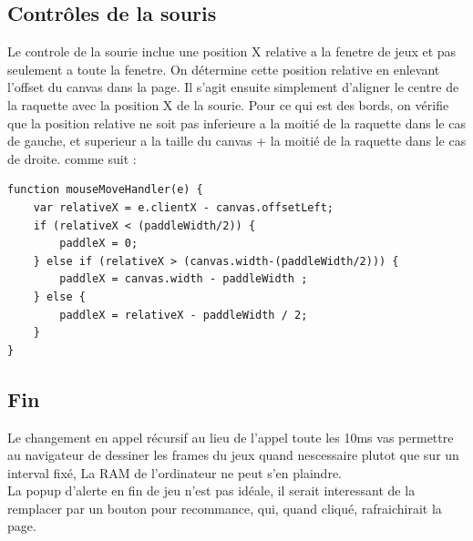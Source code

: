 \documentclass[12pt]{exam}
\begin{document}
\subsection{Contrôles de la souris}
Le controle de la sourie inclue une position X relative a la fenetre de jeux et pas seulement a toute la fenetre. On détermine cette position relative en enlevant l'offset du canvas dans la page. Il s'agit ensuite simplement d'aligner le centre de la raquette avec la position X de la sourie. Pour ce qui est des bords, on vérifie que la position relative ne soit pas inferieure a la moitié de la raquette dans le cas de gauche, et superieur a la taille du canvas + la moitié de la raquette dans le cas de droite. comme suit :
\newpage
\begin{verbatim}
function mouseMoveHandler(e) {
    var relativeX = e.clientX - canvas.offsetLeft;
    if (relativeX < (paddleWidth/2)) {
        paddleX = 0;
    } else if (relativeX > (canvas.width-(paddleWidth/2))) {
        paddleX = canvas.width - paddleWidth ;
    } else {
        paddleX = relativeX - paddleWidth / 2;
    }
}
\end{verbatim}

\subsection{Fin}
Le changement en appel récursif au lieu de l'appel toute les 10ms vas permettre au navigateur de dessiner les frames du jeux quand nescessaire plutot que sur un interval fixé, La RAM de l'ordinateur ne peut s'en plaindre.\\
La popup d'alerte en fin de jeu n'est pas idéale, il serait interessant de la remplacer par un bouton pour recommance, qui, quand cliqué, rafraichirait la page.
\end{document}
